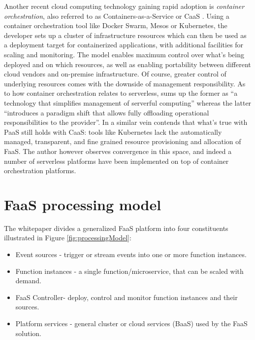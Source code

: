 Another recent cloud computing technology gaining rapid adoption is \textit{container orchestration}, also referred to as Containers-as-a-Service or CaaS \parencite{cncf18serverlessWG}. Using a container orchestration tool like Docker Swarm, Mesos or Kubernetes, the developer sets up a cluster of infrastructure resources which can then be used as a deployment target for containerized applications, with additional facilities for scaling and monitoring. The model enables maximum control over what's being deployed and on which resources, as well as enabling portability between different cloud vendors and on-premise infrastructure. Of course, greater control of underlying resources comes with the downside of management responsibility. As to how container orchestration relates to serverless, \textcite{jonas19berkeleyView} sums up the former as ``a technology that simplifies management of serverful computing'' whereas the latter ``introduces a paradigm shift that allows fully offloading operational responsibilities to the provider''. In a similar vein \textcite{robert2016serverlessarchitectures} contends that what's true with PaaS still holds with CaaS: tools like Kubernetes lack the automatically managed, transparent, and fine grained resource provisioning and allocation of FaaS. The author however observes convergence in this space, and indeed a number of serverless platforms have been implemented on top of container orchestration platforms.

\section{FaaS processing model} \label{sec:processingModel}

The \textcite{cncf18serverlessWG} whitepaper divides a generalized FaaS platform into four constituents illustrated in Figure \ref{fig:processingModel}:

\begin{itemize}
  \item Event sources - trigger or stream events into one or more function instances.
  \item Function instances - a single function/microservice, that can be scaled with demand.
  \item FaaS Controller- deploy, control and monitor function instances and their sources.
  \item Platform services - general cluster or cloud services (BaaS) used by the FaaS solution.
\end{itemize}

